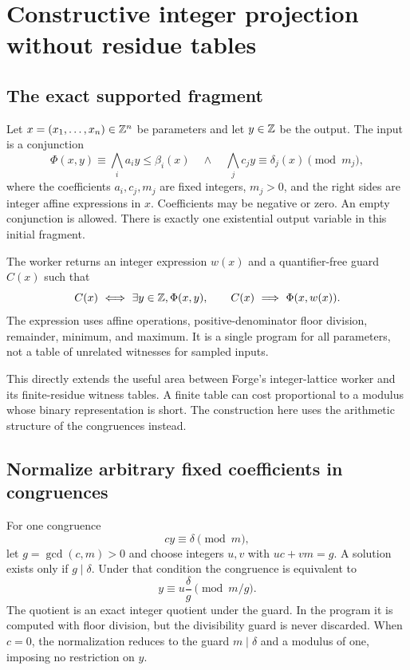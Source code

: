 \section{Constructive integer projection without residue tables}
\label{sec:projection}

\subsection{The exact supported fragment}
Let $x=(x_1,\ldots,x_n)\in\mathbb{Z}^n$ be parameters and let $y\in\mathbb{Z}$ be the output.
The input is a conjunction
\begin{equation}
\label{eq:projection-input}
 \Phi(x,y)\equiv
 \bigwedge_i a_i y\le\beta_i(x)
 \quad\land\quad
 \bigwedge_j c_jy\equiv\delta_j(x)\pmod{m_j},
\end{equation}
where the coefficients $a_i,c_j,m_j$ are fixed integers, $m_j>0$, and the right
sides are integer affine expressions in $x$. Coefficients may be negative or
zero. An empty conjunction is allowed. There is exactly one existential output
variable in this initial fragment.

The worker returns an integer expression $w(x)$ and a quantifier-free guard
$C(x)$ such that
\begin{equation}
\label{eq:projection-contract}
 C(x)\ \Longleftrightarrow\ \exists y\in\mathbb{Z},\Phi(x,y),
 \qquad C(x)\ \Longrightarrow\ \Phi(x,w(x)).
\end{equation}
The expression uses affine operations, positive-denominator floor division,
remainder, minimum, and maximum. It is a single program for all parameters, not
a table of unrelated witnesses for sampled inputs.

This directly extends the useful area between Forge's integer-lattice worker
and its finite-residue witness tables. A finite table can cost proportional to a
modulus whose binary representation is short. The construction here uses the
arithmetic structure of the congruences instead.

\subsection{Normalize arbitrary fixed coefficients in congruences}
For one congruence
\[
 c y\equiv\delta\pmod m,
\]
let $g=\gcd(c,m)>0$ and choose integers $u,v$ with $uc+vm=g$. A solution exists
only if $g\mid\delta$. Under that condition the congruence is equivalent to
\begin{equation}
\label{eq:normalize-congruence}
 y\equiv u\frac{\delta}{g}\pmod{m/g}.
\end{equation}
The quotient is an exact integer quotient under the guard. In the program it
is computed with floor division, but the divisibility guard is never discarded.
When $c=0$, the normalization reduces to the guard $m\mid\delta$ and a modulus
of one, imposing no restriction on $y$.

